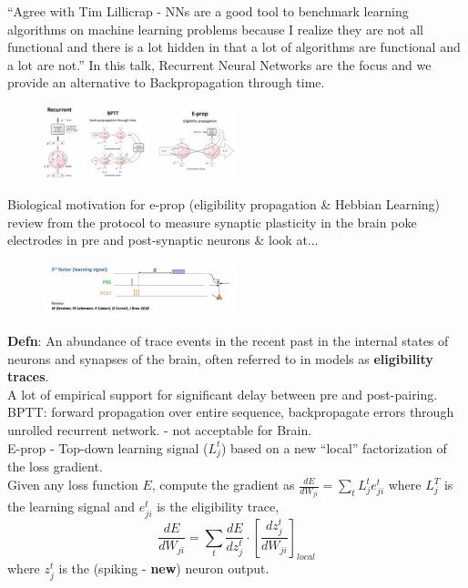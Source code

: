 \documentclass[12pt]{article}
\begin{document}
``Agree with Tim Lillicrap - NNs are a good tool to benchmark learning algorithms on machine learning problems because I realize they are not all functional and there is a lot hidden in that a lot of algorithms are functional and a lot are not.'' In this talk, Recurrent Neural Networks are the focus and we provide an alternative to Backpropagation through time. \\
\begin{figure}
  \centering
      \includegraphics[width=0.5\textwidth]{images/eprop.png}
  \caption{}
\end{figure}

Biological motivation for e-prop (eligibility propagation \& Hebbian Learning) review from \cite{Gerstner18} the protocol to measure synaptic plasticity in the brain poke electrodes in pre and post-synaptic neurons \& look at... \\
\begin{figure}
  \centering
      \includegraphics[width=0.5\textwidth]{images/3fl.png}
  \caption{}
\end{figure}

\textbf{Defn}: An abundance of trace events in the recent past in the internal states of neurons and synapses of the brain, often referred to in models as \textbf{eligibility traces}. \\

A lot of empirical support for significant delay between pre and post-pairing. \\

BPTT: forward propagation over entire sequence, backpropagate errors through unrolled recurrent network. - not acceptable for Brain. \\

E-prop - Top-down learning signal ($L_j^t$) based on a new ``local'' factorization of the loss gradient. \\

Given any loss function $E$, compute the gradient as $\frac{dE}{dW_{ji}} = \sum_t L_j^te_{ji}^t$ where $L_j^T$ is the learning signal and $e^t_{ji}$ is the eligibility trace, 
$$\frac{dE}{dW_{ji}} = \sum_t \frac{dE}{dz_j^t}\cdot[\frac{dz_j^t}{dW_{ji}}]_{local}$$
where $z_j^t$ is the (spiking - \textbf{new}) neuron output. \\
\end{document}
